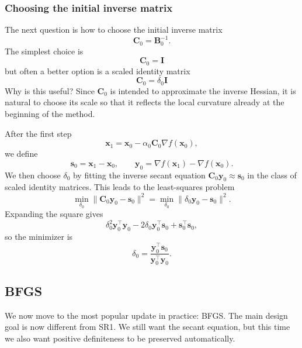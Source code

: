 \subsubsection{Choosing the initial inverse matrix}
\label{sec:ch6-initial-matrix}
The next question is how to choose the initial inverse matrix
\[
  \mathbf{C}_0=\mathbf{B}_0^{-1}.
\]
The simplest choice is
\[
  \mathbf{C}_0=\mathbf{I}
\]
but often a better option is a scaled identity matrix
\[
  \mathbf{C}_0=\delta_0 \mathbf{I}
\]
Why is this useful? Since $\mathbf{C}_0$ is intended to approximate the
inverse Hessian, it is natural to choose its scale so that it reflects the
local curvature already at the beginning of the method.

After the first step
\[
  \mathbf{x}_1=\mathbf{x}_0-\alpha_0 \mathbf{C}_0 \nabla f(\mathbf{x}_0),
\]
we define
\[
  \mathbf{s}_0=\mathbf{x}_1-\mathbf{x}_0,
  \qquad
  \mathbf{y}_0=\nabla f(\mathbf{x}_1)-\nabla f(\mathbf{x}_0).
\]
We then choose $\delta_0$ by fitting the inverse secant equation
$\mathbf{C}_0\mathbf{y}_0\approx \mathbf{s}_0$ in the class of scaled identity
matrices. This leads to the least-squares problem
\[
  \min_{\delta_0}\|\mathbf{C}_0\mathbf{y}_0-\mathbf{s}_0\|^2
  =
  \min_{\delta_0}\|\delta_0\mathbf{y}_0-\mathbf{s}_0\|^2.
\]
Expanding the square gives
\[
  \delta_0^2 \mathbf{y}_0^\top \mathbf{y}_0
  -2\delta_0 \mathbf{y}_0^\top \mathbf{s}_0
  +\mathbf{s}_0^\top \mathbf{s}_0,
\]
so the minimizer is
\begin{equation}
  \label{eq:ch6-initial-scale}
  \delta_0=\frac{\mathbf{y}_0^\top \mathbf{s}_0}
  {\mathbf{y}_0^\top \mathbf{y}_0}.
\end{equation}

\subsection{BFGS}
\label{sec:ch6-bfgs}
We now move to the most popular update in practice: BFGS. The main design goal
is now different from SR1. We still want the secant equation, but this time we
also want positive definiteness to be preserved automatically.

